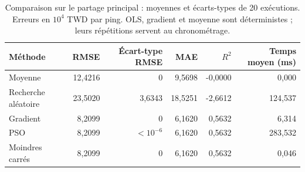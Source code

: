 \begin{table}[t]\centering\small
\caption{Comparaison sur le partage principal : moyennes et écarts-types de 20 exécutions. Erreurs en $10^4$ TWD par ping. OLS, gradient et moyenne sont déterministes ; leurs répétitions servent au chronométrage.}
\label{tab:resultats}
\begin{tabular}{lrrrrr}\toprule
Méthode & RMSE & Écart-type RMSE & MAE & $R^2$ & Temps moyen (ms)\\\midrule
Moyenne & 12,4216 & 0 & 9,5698 & -0,0000 & 0,000\\
Recherche aléatoire & 23,5020 & 3,6343 & 18,5251 & -2,6612 & 124,537\\
Gradient & 8,2099 & 0 & 6,1620 & 0,5632 & 6,314\\
PSO & 8,2099 & $<10^{-6}$ & 6,1620 & 0,5632 & 283,532\\
Moindres carrés & 8,2099 & 0 & 6,1620 & 0,5632 & 0,046\\
\bottomrule
\end{tabular}
\end{table}

